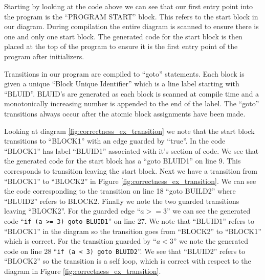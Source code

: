 Starting by looking at the code above we can see that our first entry point into the program is the ``PROGRAM START'' block. This refers to the start block in our diagram. During compilation the entire diagram is scanned to ensure there is one and only one start block. The generated code for the start block is then placed at the top of the program to ensure it is the first entry point of the program after initializers. 

Transitions in our program are compiled to ``goto'' statements. Each block is given a unique ``Block Unique Identifier'' which is a line label starting with ``BLUID''. BLUID's are generated as each block is scanned at compile time and a monotonically increasing number is appended to the end of the label. The ``goto'' transitions always occur after the atomic block assignments have been made.

Looking at diagram \ref{fig:correctness_ex_transition} we note that the start block transitions to ``BLOCK1'' with an edge guarded by ``true''. In the code ``BLOCK1'' has label ``BLUID1'' associated with it's section of code. We see that the generated code for the start block has a ``goto BLUID1'' on line 9. This corresponds to transition leaving the start block. Next we have a transition from ``BLOCK1'' to ``BLOCK2'' in Figure \ref{fig:correctness_ex_transition}. We can see the code corresponding to the transition on line 18 ``goto BUILD2'' where ``BLUID2'' refers to BLOCK2. Finally we note the two guarded transitions leaving ``BLOCK2''. For the guarded edge ``$a >= 3$'' we can see the generated code ``\texttt{if (a >= 3) goto BLUID1}'' on line 27. We note that ``BLUID1'' refers to ``BLOCK1'' in the diagram so the transition goes from ``BLOCK2'' to ``BLOCK1'' which is correct. For the transition guarded by ``$a < 3$'' we note the generated code on line 28 ``\texttt{if (a < 3) goto BLUID2}''. We see that ``BLUID2'' refers to ``BLOCK2'' so the transition is a self loop, which is correct with respect to the diagram in Figure \ref{fig:correctness_ex_transition}.






